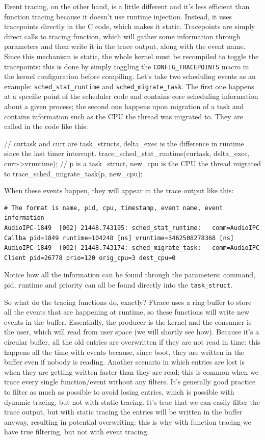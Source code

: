 Event tracing, on the other hand, is a little different and it's less efficient than function tracing because it doesn't use runtime injection. Instead, it uses tracepoints directly in the C code, which makes it static. Tracepoints are simply direct calls to tracing function, which will gather some information through parameters and then write it in the trace output, along with the event name. Since this mechanism is static, the whole kernel must be recompiled to toggle the tracepoints: this is done by simply toggling the \verb|CONFIG_TRACEPOINTS| macro in the kernel configuration before compiling. Let's take two scheduling events as an example: \verb|sched_stat_runtime| and \verb|sched_migrate_task|. The first one happens at a specific point of the scheduler code and contains core scheduling information about a given process; the second one happens upon migration of a task and contains information such as the CPU the thread was migrated to. They are called in the code like this:
\begin{code}
// curtask and curr are task_structs, delta_exec is the difference in runtime since the last timer interrupt. 
trace_sched_stat_runtime(curtask, delta_exec, curr->vruntime);
// p is a task_struct, new_cpu is the CPU the thread migrated to
trace_sched_migrate_task(p, new_cpu);
\end{code}
When these events happen, they will appear in the trace output like this:
\begin{Verbatim}[xleftmargin=-2cm,fontsize=\scriptsize]
# The format is name, pid, cpu, timestamp, event name, event information 
AudioIPC-1849  [002] 21448.743195: sched_stat_runtime:   comm=AudioIPC Callba pid=1849 runtime=104248 [ns] vruntime=3462508278368 [ns]
AudioIPC-1849  [002] 21448.743174: sched_migrate_task:   comm=AudioIPC Client pid=26778 prio=120 orig_cpu=3 dest_cpu=0
\end{Verbatim} 

Notice how all the information can be found through the parameters: command, pid, runtime and priority can all be found directly into the \verb|task_struct|.

So what do the tracing functions do, exactly? Ftrace uses a ring buffer to store all the events that are happening at runtime, so these functions will write new events in the buffer. Essentially, the producer is the kernel and the consumer is the user, which will read from user space (we will shortly see how). Because it's a circular buffer, all the old entries are overwritten if they are not read in time: this happens all the time with events because, since boot, they are written in the buffer even if nobody is reading. Another scenario in which entries are lost is when they are getting written faster than they are read: this is common when we trace every single function/event without any filters. It's generally good practice to filter as much as possible to avoid losing entries, which is possible with dynamic tracing, but not with static tracing. It's true that we can easily filter the trace output, but with static tracing the entries will be written in the buffer anyway, resulting in potential overwriting: this is why with function tracing we have true filtering, but not with event tracing.


